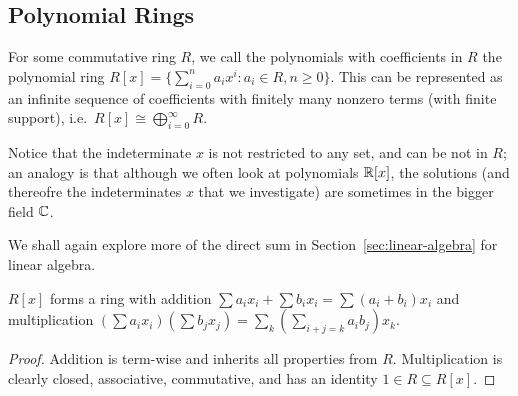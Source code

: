 \subsection{Polynomial Rings}

\begin{definition}
    For some commutative ring \(R\),
    we call the polynomials with coefficients in \(R\)
    the polynomial ring \(R[x] = \{\sum_{i=0}^n a_i x^i : a_i \in R, n \geq 0\}\).
    This can be represented as an infinite sequence of coefficients
    with finitely many nonzero terms (with finite support),
    i.e.\ \(R[x] \cong \bigoplus_{i=0}^\infty R\).
\end{definition}
\begin{remark}
    Notice that the indeterminate \(x\) is not restricted to any set,
    and can be not in \(R\);
    an analogy is that although we often look at polynomials \(\mathbb{R}[x]\),
    the solutions (and thereofre the indeterminates \(x\) that we investigate)
    are sometimes in the bigger field \(\mathbb{C}\).
\end{remark}
\begin{remark}
    We shall again explore more of the direct sum
    in Section~\ref{sec:linear-algebra} for linear algebra.
\end{remark}
\begin{proposition}
    \(R[x]\) forms a ring with addition
    \(\sum a_i x_i + \sum b_i x_i = \sum (a_i+b_i) x_i\)
    and multiplication
    \((\sum a_i x_i)(\sum b_j x_j) = \sum_k (\sum_{i+j=k} a_i b_j) x_k\).
\end{proposition}
\begin{proof}
    Addition is term-wise and inherits all properties from \(R\).
    Multiplication is clearly closed, associative, commutative,
    and has an identity \(1 \in R \subseteq R[x]\).
\end{proof}

